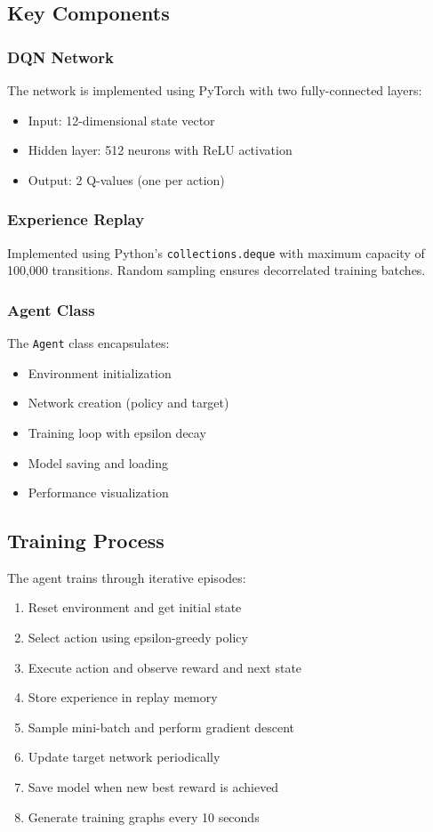 \documentclass[12pt,a4paper]{article}
\begin{document}
\subsection{Key Components}

\subsubsection{DQN Network}
The network is implemented using PyTorch with two fully-connected layers:
\begin{itemize}
    \item Input: 12-dimensional state vector
    \item Hidden layer: 512 neurons with ReLU activation
    \item Output: 2 Q-values (one per action)
\end{itemize}

\subsubsection{Experience Replay}
Implemented using Python's \texttt{collections.deque} with maximum capacity of 100,000 transitions. Random sampling ensures decorrelated training batches.

\subsubsection{Agent Class}
The \texttt{Agent} class encapsulates:
\begin{itemize}
    \item Environment initialization
    \item Network creation (policy and target)
    \item Training loop with epsilon decay
    \item Model saving and loading
    \item Performance visualization
\end{itemize}

\subsection{Training Process}
The agent trains through iterative episodes:
\begin{enumerate}
    \item Reset environment and get initial state
    \item Select action using epsilon-greedy policy
    \item Execute action and observe reward and next state
    \item Store experience in replay memory
    \item Sample mini-batch and perform gradient descent
    \item Update target network periodically
    \item Save model when new best reward is achieved
    \item Generate training graphs every 10 seconds
\end{enumerate}
\end{document}
